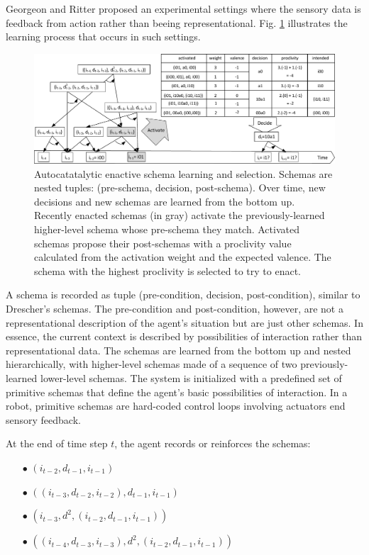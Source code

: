 \documentclass[runningheads]{llncs}
\begin{document}
Georgeon and Ritter \cite{georgeon_intrinsically-motivated_2012} proposed an experimental settings where the sensory data is feedback from action rather than beeing representational. 
Fig. \ref{fig:agent8} illustrates the learning process that occurs in such settings. 

\begin{figure}
	\centering
	\includegraphics[width=1.0\textwidth]{Figure_3_agent8.pdf}
	\caption{Autocatatalytic enactive schema learning and selection.
	Schemas are nested tuples: (pre-schema, decision, post-schema).
	Over time, new decisions and new schemas are learned from the bottom up. 
	Recently enacted schemas (in gray) activate the previously-learned higher-level schema whose pre-schema they match.
	Activated schemas propose their post-schemas with a proclivity value calculated from the activation weight and the expected valence.
	The schema with the highest proclivity is selected to try to enact.} 
	\label{fig:agent8}
\end{figure}

A schema is recorded as tuple (pre-condition, decision, post-condition), similar to Drescher's schemas.
The pre-condition and post-condition, however, are not a representational description of the agent's situation but are just other schemas. 
In essence, the current context is described by possibilities of interaction rather than representational data. 
The schemas are learned from the bottom up and nested hierarchically, with higher-level schemas made of a sequence of two previously-learned lower-level schemas. 
The system is initialized with a predefined set of primitive schemas that define the agent's basic possibilities of interaction. 
In a robot, primitive schemas are hard-coded control loops involving actuators end sensory feedback. 

At the end of time step $t$, the agent records or reinforces the schemas: 
\begin{itemize}
	\item[$\bullet$] $(i_{t-2}, d_{t-1}, i_{t-1})$
	\item[$\bullet$] $((i_{t-3}, d_{t-2}, i_{t-2}), d_{t-1}, i_{t-1})$
	\item[$\bullet$] $(i_{t-3}, d^2, (i_{t-2}, d_{t-1}, i_{t-1}))$
	\item[$\bullet$] $((i_{t-4}, d_{t-3}, i_{t-3}), d^2, (i_{t-2}, d_{t-1}, i_{t-1}))$
\end{itemize}
\end{document}
